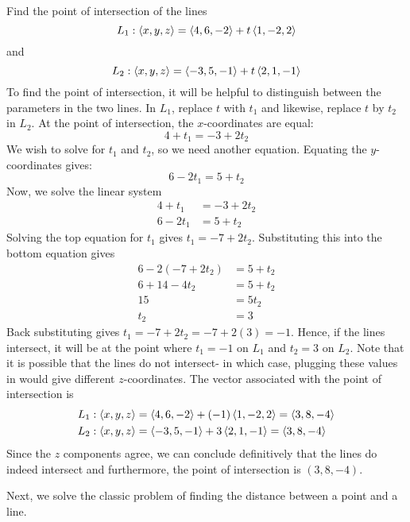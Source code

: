 \documentclass[handout]{ximera}
\begin{document}
\begin{example}[Example 3]
Find the point of intersection of the lines
\[
L_1: \left\langle x, y, z\right\rangle = \left\langle 4, 6, -2\right\rangle + t\left\langle 1, -2, 2\right\rangle
\]
and 
\[
L_2: \left\langle x, y, z\right\rangle = \left\langle -3, 5, -1\right\rangle + t\left\langle 2, 1, -1\right\rangle
\]
To find the point of intersection, it will be helpful to distinguish between the parameters in the two lines.
In $L_1$, replace $t$ with $t_1$ and likewise, replace $t$ by $t_2$ in $L_2$. 
At the point of intersection, the $x$-coordinates are equal:
\[
4+t_1 = -3 + 2t_2
\]
We wish to solve for $t_1$ and $t_2$, so we need another equation. Equating the $y$-coordinates gives:
\[
6 -2t_1 = 5 + t_2
\]
Now, we solve the linear system
\begin{align*}
4+t_1 &= -3 + 2t_2\\
6 -2t_1 &= 5 + t_2
\end{align*}
Solving the top equation for $t_1$ gives $t_1 = -7 + 2t_2$.  Substituting this into the bottom equation gives
\begin{align*}
6 - 2(-7+2t_2) &= 5 + t_2\\
6 + 14 - 4t_2 & = 5 + t_2\\
15 &= 5t_2\\
t_2 &=3
\end{align*}
Back substituting gives $t_1 = -7 + 2t_2 = -7 + 2(3) = -1$.
Hence, if the lines intersect, it will be at the point where $t_1 = -1$ on $L_1$ and $t_2 = 3$ on $L_2$.
Note that it is possible that the lines do not intersect- in which case, plugging these values in would 
give different $z$-coordinates.
The vector associated with the point of intersection is
\begin{align*}
L_1: \left\langle x, y, z\right\rangle &= \left\langle 4, 6, -2\right\rangle + (-1)\left\langle 1, -2, 2\right\rangle = \left\langle 3, 8, -4\right\rangle\\
L_2: \left\langle x, y, z\right\rangle &= \left\langle -3, 5, -1\right\rangle + 3\left\langle 2, 1, -1\right\rangle = \left\langle 3, 8, -4\right\rangle
\end{align*}
Since the $z$ components agree, we can conclude definitively that the lines do indeed intersect and furthermore, 
the point of intersection is $(3, 8, -4)$.
\end{example}

Next, we solve the classic problem of finding the distance between a point and a line.
\end{document}

